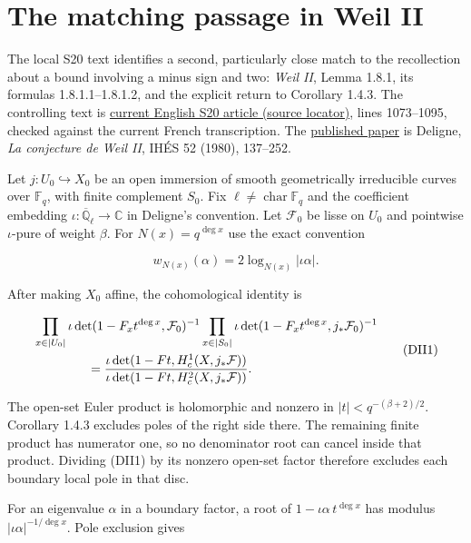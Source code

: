 \section{The matching passage in Weil
II}\label{CFStage:the-matching-passage-in-weil-ii}

The local S20 text identifies a second, particularly close match to the
recollection about a bound involving a minus sign and two: \emph{Weil
II}, Lemma 1.8.1, its formulas 1.8.1.1--1.8.1.2, and the explicit return
to Corollary 1.4.3. The controlling text is
\href{sources/current_cohorts/snapshots/cf341/total_object_sources/WEIL_II_SOURCE_LOCATOR.md}{current English S20 article
(source locator)}, lines 1073--1095, checked against the
current French transcription. The
\href{https://archive.numdam.org/articles/10.1007/BF02684780/}{published
paper} is Deligne, \emph{La conjecture de Weil II}, IHÉS 52 (1980),
137--252.

Let \(j:U_0\hookrightarrow X_0\) be an open immersion of smooth
geometrically irreducible curves over \(\mathbb F_q\), with finite
complement \(S_0\). Fix \(\ell\ne\operatorname{char}\mathbb F_q\) and
the coefficient embedding
\(\iota:\overline{\mathbb Q}_\ell\to\mathbb C\) in Deligne's convention.
Let \(\mathcal F_0\) be lisse on \(U_0\) and pointwise \(\iota\)-pure of
weight \(\beta\). For \(N(x)=q^{\deg x}\) use the exact convention

\[w_{N(x)}(\alpha)=2\log_{N(x)}|\iota\alpha|.\]

After making \(X_0\) affine, the cohomological identity is

\[\begin{aligned}
&\prod_{x\in|U_0|}\iota\det(1-F_xt^{\deg x},\mathcal F_0)^{-1}
\prod_{x\in|S_0|}\iota\det(1-F_xt^{\deg x},j_*\mathcal F_0)^{-1}\\
&\hspace{15mm}=\frac{\iota\det(1-Ft,H_c^1(X,j_*\mathcal F))}
 {\iota\det(1-Ft,H_c^2(X,j_*\mathcal F))}.
\end{aligned}\tag{DII1}\]

The open-set Euler product is holomorphic and nonzero in
\(|t|<q^{-(\beta+2)/2}\). Corollary 1.4.3 excludes poles of the right
side there. The remaining finite product has numerator one, so no
denominator root can cancel inside that product. Dividing (DII1) by its
nonzero open-set factor therefore excludes each boundary local pole in
that disc.

For an eigenvalue \(\alpha\) in a boundary factor, a root of
\(1-\iota\alpha\,t^{\deg x}\) has modulus \(|\iota\alpha|^{-1/\deg x}\).
Pole exclusion gives

